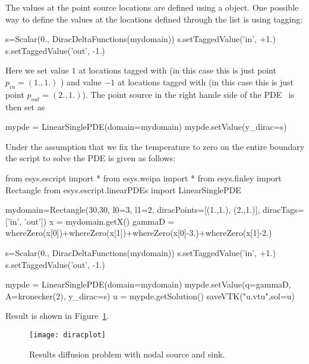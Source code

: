 The values at the point source locations are defined using a \Data object. One possible
way to define the values at the locations defined through the  list is using tagging: 
\begin{python}
s=Scalar(0., DiracDeltaFunctions(mydomain))
s.setTaggedValue('in', +1.)
s.setTaggedValue('out', -1.)
\end{python}
Here we set value $1$ at locations tagged with  (in this case this is just point $p_{in}=(1.,1.)$ ) and value $-1$ at locations tagged with  (in this case this is just point $p_{out}=(2.,1.)$). The point source in the right hande side of the PDE~ is then set as
\begin{python}
mypde = LinearSinglePDE(domain=mydomain)
mypde.setValue(y_dirac=s)
\end{python}
Under the assumption that we fix the temperature to zero on the entire boundary 
the script to solve the PDE is given as follows:
\begin{python}
from esys.escript import *
from esys.weipa import *
from esys.finley import Rectangle
from esys.escript.linearPDEs import LinearSinglePDE

mydomain=Rectangle(30,30, l0=3, l1=2, 
                diracPoints=[(1.,1.), (2.,1.)],  diracTags=['in', 'out'])
x = mydomain.getX()
gammaD = whereZero(x[0])+whereZero(x[1])+whereZero(x[0]-3.)+whereZero(x[1]-2.)

s=Scalar(0., DiracDeltaFunctions(mydomain))
s.setTaggedValue('in', +1.)
s.setTaggedValue('out', -1.)

mypde = LinearSinglePDE(domain=mydomain)
mypde.setValue(q=gammaD, A=kronecker(2), y_dirac=s)
u = mypde.getSolution()
saveVTK("u.vtu",sol=u)
\end{python}
%
Result is shown in Figure~\ref{FIG:EX:DIRAC}.
%
\begin{figure}[ht]
\center
\texttt{[image: diracplot]}
\caption{Results diffusion problem with nodal source and sink.}
\label{FIG:EX:DIRAC}
\end{figure}

